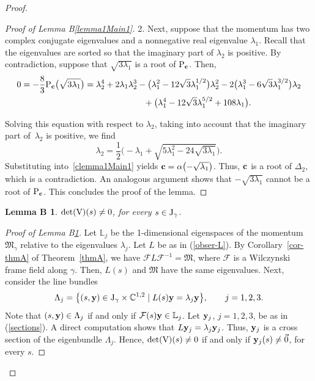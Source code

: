 \documentclass[10pt,a4paper]{amsart}
\numberwithin{equation}{section}
\newtheorem{lemmaB}{Lemma B\ignorespaces}
\def\C{\mathbb{C}}
\begin{document}
\begin{proof}
\begin{proof}[Proof of Lemma B\ref{lemma1Main1}]
2. Next, suppose that the momentum has two complex conjugate eigenvalues and a nonnegative real
eigenvalue $\lambda_1$.
Recall that the eigenvalues are sorted so that the imaginary part of $\lambda_2$ is positive. By contradiction,
suppose that $\sqrt{3\lambda_1}$ is a root of ${\rm P}_{{\bf c}}$. Then,
 \begin{gather*}
 0=-\frac{8}{3}{\rm P}_{{\bf c}}\big(\sqrt{3\lambda_1}\big) =\lambda_2^4+2\lambda_1\lambda_2^3-\big(\lambda_1^2-12\sqrt{3}\lambda_1^{1/2}\big)\lambda_2^2-2\big(\lambda_1^3-6\sqrt{3}\lambda_1^{3/2}\big)\lambda_2\\
\hphantom{0=-\frac{8}{3}{\rm P}_{{\bf c}}\big(\sqrt{3\lambda_1}\big)=}{}
+\big(\lambda_1^4-12\sqrt{3}\lambda_1^{5/2}+108\lambda_1\big).
\end{gather*}

Solving this equation with respect to $\lambda_2$, taking into account that the imaginary part of~$\lambda_2$ is positive,
we find
\[
 \lambda_2=\frac{1}{2}\biggl(-\lambda_1+\sqrt{5\lambda_1^2-24\sqrt{3\lambda_1}}\biggr).
\]
Substituting into~\eqref{clemma1Main1} yields ${\bf c}=\alpha\bigl(-\sqrt{\lambda_1}\bigr)$. Thus, ${\bf c}$ is a root of $\Delta_2$,
which is a contradiction. An analogous argument shows that $-\sqrt{3\lambda_1}$ cannot be a root of ${\rm P}_{{\bf c}}$.
This concludes the proof of the lemma.
\end{proof}

\begin{lemmaB}\label{lemma2Main1}
${\rm{det}}({\rm V})(s)\neq 0$, for every $s\in {\rm J}_{\gamma}$.
\end{lemmaB}

\begin{proof}[Proof of Lemma B\ref{lemma2Main1}]
Let ${\mathbb L}_j$ be the 1-dimensional eigenspaces of the momentum
${\mathfrak M}_{\gamma}$ relative to the eigenvalues $\lambda_j$.
Let $L$ be as in (\ref{obser-L}). By Corollary~\ref{cor-thmA} of Theorem~\ref{thmA},
we have ${{\mathcal F} L {\mathcal F}^{-1}={\mathfrak M}}$,
where ${\mathcal F}$ is a
Wilczynski
frame field along $\gamma$.
Then,
${L}(s)$ and ${\mathfrak M}$ have the same eigenvalues. Next, consider the line bundles
\[
 \Lambda_j=\big\{(s,{\bf y})\in {\rm J}_{\gamma}\times \C^{1,2} \mid {L}(s){\bf y}=\lambda_j{\bf y}\big\},\qquad j=1,2,3.
\]
Note that $(s,{\bf y})\in \Lambda_j$ if and only if ${\mathcal F}(s){\bf y}\in {\mathbb L}_j$. Let ${\bf y}_j$, $j=1,2,3$,
be as in (\ref{sections}). A direct computation shows that ${L}{\bf y}_j=\lambda_j {\bf y}_j$. Thus,
${\bf y}_j$
is a cross section of the eigenbundle $\Lambda_j$. Hence, ${\rm{det}}({\rm V})(s)\neq 0$ if and only if
 ${\bf y}_j(s)\neq \vec{0}$, for every $s$.


\end{proof}
\end{proof}
\end{document}
